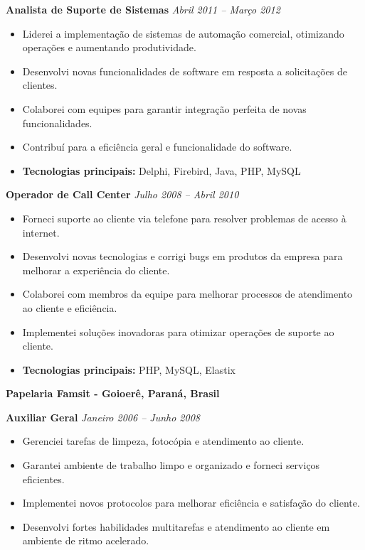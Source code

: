 \documentclass[12pt,a4paper,sans]{moderncv}
\begin{document}
\vspace{12pt}
\textbf{Analista de Suporte de Sistemas} \hfill \textit{Abril 2011 -- Março 2012}
\begin{itemize}
    \item Liderei a implementação de sistemas de automação comercial, otimizando operações e aumentando produtividade.
    \item Desenvolvi novas funcionalidades de software em resposta a solicitações de clientes.
    \item Colaborei com equipes para garantir integração perfeita de novas funcionalidades.
    \item Contribuí para a eficiência geral e funcionalidade do software.
    \item \textbf{Tecnologias principais:} Delphi, Firebird, Java, PHP, MySQL
\end{itemize}

\vspace{12pt}
\textbf{Operador de Call Center} \hfill \textit{Julho 2008 -- Abril 2010}
\begin{itemize}
    \item Forneci suporte ao cliente via telefone para resolver problemas de acesso à internet.
    \item Desenvolvi novas tecnologias e corrigi bugs em produtos da empresa para melhorar a experiência do cliente.
    \item Colaborei com membros da equipe para melhorar processos de atendimento ao cliente e eficiência.
    \item Implementei soluções inovadoras para otimizar operações de suporte ao cliente.
    \item \textbf{Tecnologias principais:} PHP, MySQL, Elastix
\end{itemize}

\vspace{24pt}
\small{\textbf{Papelaria Famsit - Goioerê, Paraná, Brasil}}
\vspace{3pt}

\textbf{Auxiliar Geral} \hfill \textit{Janeiro 2006 -- Junho 2008}
\begin{itemize}
    \item Gerenciei tarefas de limpeza, fotocópia e atendimento ao cliente.
    \item Garantei ambiente de trabalho limpo e organizado e forneci serviços eficientes.
    \item Implementei novos protocolos para melhorar eficiência e satisfação do cliente.
    \item Desenvolvi fortes habilidades multitarefas e atendimento ao cliente em ambiente de ritmo acelerado.
\end{itemize}
\end{document}
